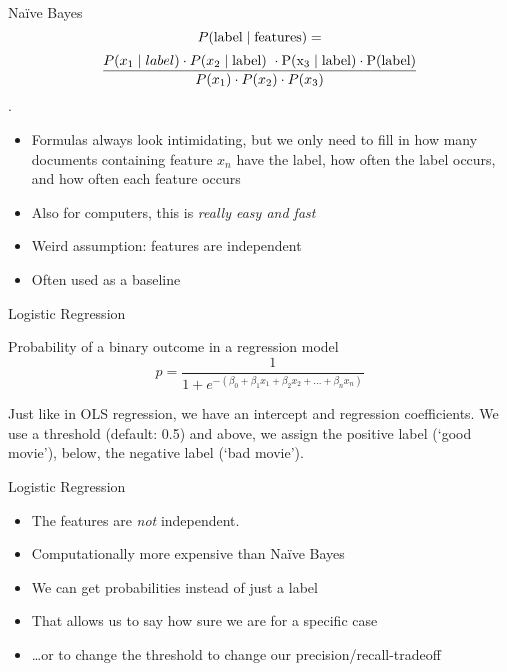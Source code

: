 \begin{frame}{Na\"ive Bayes}
$$ P(\rm{label} \mid \rm{features}) =$$
$$ \frac{P(x_1 \mid label) \cdot P(x_2 \mid \rm{label})\ \cdot P(x_3 \mid label) \cdot P(label)}{P(x_1) \cdot P(x_2) \cdot P(x_3)}$$.

	
\begin{itemize}
	\item Formulas always look intimidating, but we only need to fill in how many documents containing feature $x_n$ have the label, how often the label occurs, and how often each feature occurs
	\item Also for computers, this is \emph{really easy and fast}
	\item Weird assumption: features are independent
	\item Often used as a baseline
\end{itemize}
\end{frame}




\begin{frame}{Logistic Regression}
	\begin{block}{Probability of a binary outcome in a regression model}
		$$p = \frac{1}{1 + e^{-(\beta_0 + \beta_1 x_1 + \beta_2 x_2 + \ldots + \beta_n x_n)}}$$
	\end{block}
	Just like in OLS regression, we have an intercept and regression coefficients. 
	We use a threshold (default: 0.5) and above, we assign the positive label (`good movie'), below, the negative label (`bad movie').
\end{frame}
\begin{frame}{Logistic Regression}
	\begin{itemize}[<+->]
		\item The features are \emph{not} independent.
		\item Computationally more expensive than Naïve Bayes
		\item We can get probabilities instead of just a label
		\item That allows us to say how sure we are for a specific case
		\item \ldots or to change the threshold to change our precision/recall-tradeoff
	\end{itemize}
\end{frame}

